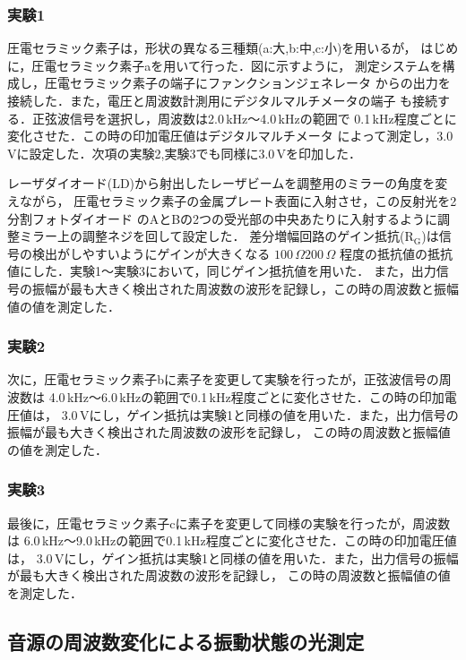 \documentclass{ltjsarticle}
\begin{document}
		\subsubsection{実験1}
			圧電セラミック素子は，形状の異なる三種類(a:大,b:中,c:小)を用いるが，
			はじめに，圧電セラミック素子aを用いて行った．図に示すように，
			測定システムを構成し，圧電セラミック素子の端子にファンクションジェネレータ
			からの出力を接続した．また，電圧と周波数計測用にデジタルマルチメータの端子
			も接続する．正弦波信号を選択し，周波数は2.0\,kHz～4.0\,kHzの範囲で
			0.1\,kHz程度ごとに変化させた．この時の印加電圧値はデジタルマルチメータ
			によって測定し，3.0\,Vに設定した．次項の実験2,実験3でも同様に3.0\,Vを印加した．

			レーザダイオード(LD)から射出したレーザビームを調整用のミラーの角度を変えながら，
			圧電セラミック素子の金属プレート表面に入射させ，この反射光を2分割フォトダイオード
			のAとBの2つの受光部の中央あたりに入射するように調整ミラー上の調整ネジを回して設定した．
			差分増幅回路のゲイン抵抗($\mathrm{R_G}$)は信号の検出がしやすいようにゲインが大きくなる
			$100\,\Omega 200\,\Omega$ 程度の抵抗値の抵抗値にした．実験1～実験3において，同じゲイン抵抗値を用いた．
			また，出力信号の振幅が最も大きく検出された周波数の波形を記録し，この時の周波数と振幅値の値を測定した．

		\subsubsection{実験2}
			次に，圧電セラミック素子bに素子を変更して実験を行ったが，正弦波信号の周波数は
			4.0\,kHz～6.0\,kHzの範囲で0.1\,kHz程度ごとに変化させた．この時の印加電圧値は，
			3.0\,Vにし，ゲイン抵抗は実験1と同様の値を用いた．また，出力信号の振幅が最も大きく検出された周波数の波形を記録し，
			この時の周波数と振幅値の値を測定した．

		\subsubsection{実験3}
			最後に，圧電セラミック素子cに素子を変更して同様の実験を行ったが，周波数は
			6.0\,kHz～9.0\,kHzの範囲で0.1\,kHz程度ごとに変化させた．この時の印加電圧値は，
			3.0\,Vにし，ゲイン抵抗は実験1と同様の値を用いた．また，出力信号の振幅が最も大きく検出された周波数の波形を記録し，
			この時の周波数と振幅値の値を測定した．

	\subsection{音源の周波数変化による振動状態の光測定}
\end{document}
